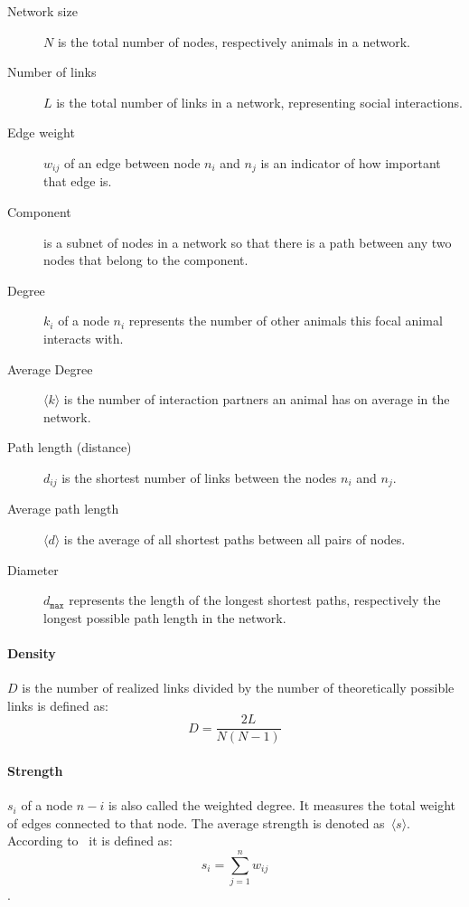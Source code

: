 \colorbox{usethiscolorhere}{
\begin{minipage}[!b]{\dimexpr\textwidth}%
\parbox{0.95\textwidth}{
\small
\begin{addmargin}[1em]{0em}
\vspace{5mm}
\begin{description}
	\item[Network size] $N$ is the total number of nodes, respectively animals in a network.
	\item[Number of links] $L$ is the total number of links in a network, representing social interactions.
	\item[Edge weight] $w_{ij}$ of an edge between node $n_i$ and $n_j$ is an indicator of how important that edge is.
	\item[Component] is a subnet of nodes in a network so that there is a path between any two nodes that belong to the component.
	\item[Degree] $k_i$ of a node $n_i$ represents the number of other animals this focal animal interacts with.
	\item[Average Degree] $\langle k \rangle$ is the number of interaction partners an animal has on average in the network.
	\item[Path length (distance)] $d_{ij}$ is the shortest number of links between the nodes $n_i$ and $n_j$.
	\item[Average path length] $\langle d \rangle$ is the average of all shortest paths between all pairs of nodes.
	\item[Diameter] $d_{\texttt{max}}$ represents the length of the longest shortest paths, respectively the longest possible path length in the network.
\end{description}
\vspace{5mm}
\end{addmargin}
}
\end{minipage}}


\paragraph{Density} $D$ is the number of realized links divided by the number
of theoretically possible links is defined as: $$D=\frac{2L}{N(N-1)}$$

\paragraph{Strength} $s_i$ of a node $n-i$ is also called the weighted degree.
It measures the total weight of edges connected to that node.
The average strength is denoted as~$\langle s \rangle$.
According to~\textcite{barrat2004architecture} it is defined as:
$$s_i = \sum_{j=1}^{n}w_{ij}$$. 

